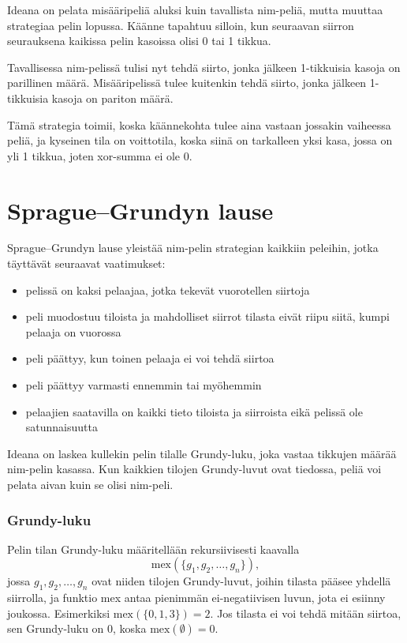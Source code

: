 Ideana on pelata misääripeliä aluksi kuin tavallista
nim-peliä, mutta muuttaa strategiaa pelin
lopussa. Käänne tapahtuu silloin, kun seuraavan
siirron seurauksena kaikissa pelin kasoissa olisi 0 tai 1 tikkua.

Tavallisessa nim-pelissä tulisi nyt tehdä siirto,
jonka jälkeen 1-tikkuisia kasoja on parillinen määrä.
Misääripelissä tulee kuitenkin tehdä siirto,
jonka jälkeen 1-tikkuisia kasoja on pariton määrä.

Tämä strategia toimii, koska käännekohta tulee aina
vastaan jossakin vaiheessa peliä,
ja kyseinen tila on voittotila,
koska siinä on tarkalleen yksi kasa,
jossa on yli 1 tikkua,
joten xor-summa ei ole 0.

\section{Sprague–Grundyn lause}


Sprague–Grundyn lause yleistää nim-pelin strategian
kaikkiin peleihin, jotka täyttävät
seuraavat vaatimukset:

\begin{itemize}[noitemsep]
\item pelissä on kaksi pelaajaa, jotka tekevät vuorotellen siirtoja
\item peli muodostuu tiloista ja mahdolliset siirrot tilasta
eivät riipu siitä, kumpi pelaaja on vuorossa
\item peli päättyy, kun toinen pelaaja ei voi tehdä siirtoa
\item peli päättyy varmasti ennemmin tai myöhemmin
\item pelaajien saatavilla on kaikki tieto tiloista
ja siirroista eikä pelissä ole satunnaisuutta
\end{itemize}
Ideana on laskea kullekin pelin tilalle Grundy-luku,
joka vastaa tikkujen määrää nim-pelin kasassa.
Kun kaikkien tilojen Grundy-luvut ovat tiedossa,
peliä voi pelata aivan kuin se olisi nim-peli.

\subsubsection{Grundy-luku}


Pelin tilan Grundy-luku määritellään rekursiivisesti
kaavalla
\[\textrm{mex}(\{g_1,g_2,\ldots,g_n\}),\]
jossa $g_1,g_2,\ldots,g_n$ ovat niiden tilojen
Grundy-luvut, joihin tilasta pääsee yhdellä siirrolla,
ja funktio mex antaa pienimmän ei-negatiivisen
luvun, jota ei esiinny joukossa.
Esimerkiksi $\textrm{mex}(\{0,1,3\})=2$.
Jos tilasta ei voi tehdä mitään siirtoa,
sen Grundy-luku on 0, koska $\textrm{mex}(\emptyset)=0$.

